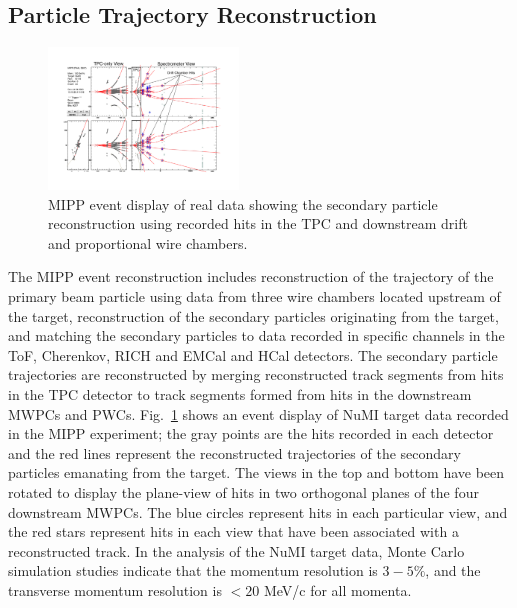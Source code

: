 \documentclass[%
aps, prd, reprint, show pacs, preprint numbers, ams math, amssymb, superscriptaddress, linenumbers]{revtex4-1}
\begin{document}
\subsection{Particle Trajectory Reconstruction}

\begin{figure}[t]
   \centering
   \includegraphics[width=0.45\textwidth]{NuMIEventDisplay}
   \caption{MIPP event display of real data showing the secondary particle reconstruction using recorded hits in the TPC and downstream drift and proportional wire chambers.}
   \label{fig:evd}
\end{figure}

The MIPP event reconstruction includes reconstruction of the trajectory of the primary beam particle using data 
from three wire chambers located upstream of the target, reconstruction of the secondary particles originating 
from the target, and matching the 
secondary particles to data recorded in specific channels in the ToF, Cherenkov, RICH and EMCal and HCal 
detectors.  The secondary particle trajectories are reconstructed by merging reconstructed track segments from 
hits in the TPC detector to track segments formed 
from hits in the downstream MWPCs and PWCs.  Fig.~\ref{fig:evd} shows an event display of NuMI target data recorded in the MIPP experiment; the gray points are the hits recorded in each detector and the red lines represent the reconstructed trajectories of the secondary particles emanating from the target.  The views in the top and bottom have been rotated to display the plane-view of hits in two orthogonal planes of the four downstream MWPCs.  The blue circles represent hits in each particular view, and the red stars represent hits in each view that have been associated with a reconstructed track.
In the analysis of the NuMI target data, Monte Carlo simulation studies indicate that the momentum resolution is $3-5\%$, and the transverse momentum resolution is $<20$ MeV/c for all momenta. 
\end{document}
